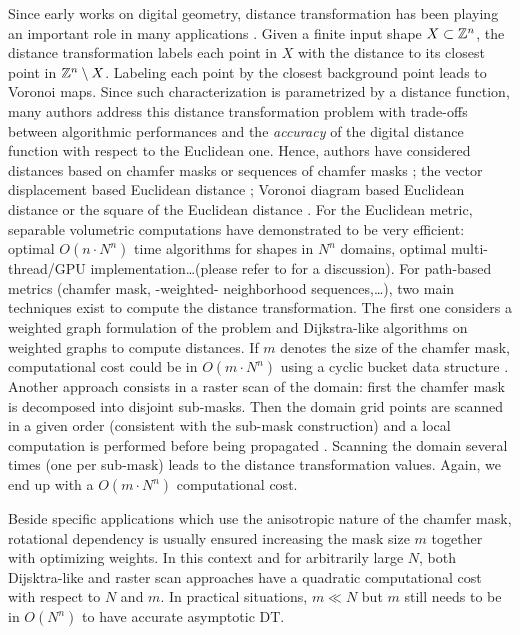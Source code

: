 \documentclass{llncs}
\begin{document}
Since early works on digital geometry, distance transformation has
been playing
an important role in many applications
\cite{Rosenfeld1966,Rosenfeld1968}. Given a finite input shape
$X\subset {\mathbb{Z}}^n$, the distance transformation labels each point in $X$
with the distance to its closest point in ${\mathbb{Z}}^n \setminus X$. Labeling
each point by the closest background point leads to Voronoi
maps. Since such characterization is parametrized by a distance
function, many authors address this distance transformation problem
with trade-offs between algorithmic performances and the
\emph{accuracy} of the digital distance function with respect to the
Euclidean one.  Hence, authors have considered distances based on
chamfer masks \cite{Rosenfeld1968,borgefors,fouard:ivc:2005} or
sequences of chamfer masks
\cite{Rosenfeld1966,mukherjee,Strand2008,DBLP:conf/dgci/NormandSE13};
the vector displacement based Euclidean distance
\cite{danielson,ragnemalm}; Voronoi diagram based Euclidean distance
\cite{BreuEtAl95,Maurer2003} or the square of the Euclidean distance
\cite{Hirata,roerdnik}.  For the Euclidean metric, separable
volumetric computations have demonstrated to be very efficient:
optimal $O(n\cdot N^n)$ time algorithms for shapes in $N^n$ domains,
optimal multi-thread/GPU implementation\ldots (please refer to
\cite{dcoeurjo_ChapDTWADGMM} for a discussion). For path-based metrics
(chamfer mask, -weighted- neighborhood sequences,\ldots), two main
techniques exist to compute the distance transformation. The first one
considers a weighted graph formulation of the problem and
Dijkstra-like algorithms on weighted graphs to compute distances. If
$m$ denotes the size of the chamfer mask, computational cost could be
in $O(m\cdot N^n)$ using a cyclic bucket data structure
\cite{verwer_uniform}. Another approach consists in a raster scan of
the domain: first the chamfer mask is decomposed into disjoint
sub-masks. Then the domain grid points are scanned in a given order
(consistent with the sub-mask construction) and a local computation is
performed before being propagated
\cite{Rosenfeld1966,borgefors}. Scanning the domain several times (one
per sub-mask) leads to the distance transformation values. Again, we
end up with a $O(m\cdot N^n)$ computational cost.

Beside specific applications which use the anisotropic nature of the
chamfer mask, rotational dependency is usually ensured  increasing
the mask size $m$ together with optimizing weights. In this context and
for arbitrarily large  $N$, both Dijsktra-like and raster scan
approaches have a quadratic computational cost   with respect to
$N$ and $m$. In practical situations, $m \ll N$ but $m$ still needs to
be in $O(N^n)$ to have accurate asymptotic DT.
\end{document}
